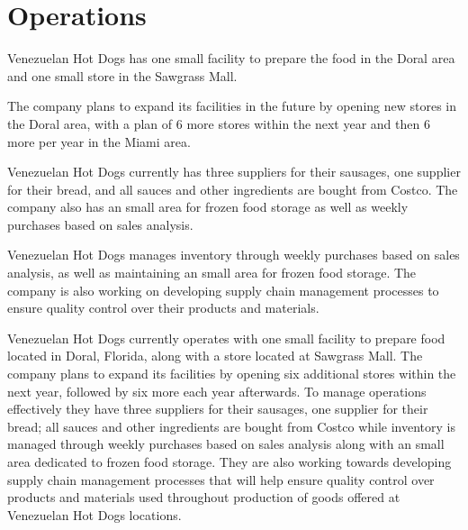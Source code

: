 

\section{Operations}\label{sec:operations}
 Venezuelan Hot Dogs has one small facility to prepare the food in the Doral area and one small store in the Sawgrass Mall. 

The company plans to expand its facilities in the future by opening new stores in the Doral area, with a plan of 6 more stores within the next year and then 6 more per year in the Miami area. 

 Venezuelan Hot Dogs currently has three suppliers for their sausages, one supplier for their bread, and all sauces and other ingredients are bought from Costco. The company also has an small area for frozen food storage as well as weekly purchases based on sales analysis. 

 Venezuelan Hot Dogs manages inventory through weekly purchases based on sales analysis, as well as maintaining an small area for frozen food storage. The company is also working on developing supply chain management processes to ensure quality control over their products and materials. 

  Venezuelan Hot Dogs currently operates with one small facility to prepare food located in Doral, Florida, along with a store located at Sawgrass Mall. The company plans to expand its facilities by opening six additional stores within the next year, followed by six more each year afterwards. To manage operations effectively they have three suppliers for their sausages, one supplier for their bread; all sauces and other ingredients are bought from Costco while inventory is managed through weekly purchases based on sales analysis along with an small area dedicated to frozen food storage. They are also working towards developing supply chain management processes that will help ensure quality control over products and materials used throughout production of goods offered at Venezuelan Hot Dogs locations.